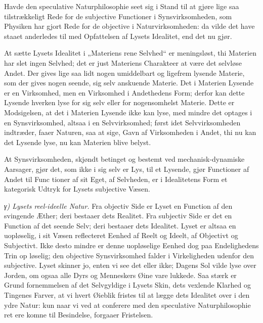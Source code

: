 \documentclass[12pt,a4paper]{book}
\newcommand{\subrunin}[1]{\emph{#1}\hspace{0.4em}}
\begin{document}
Havde den speculative Naturphilosophie seet sig i Stand til at gjøre
lige saa tilstrækkeligt Rede for de subjective Functioner i
Synsvirksomheden, som Physiken har gjort Rede for de objective i
Naturvirksomheden: da vilde det have staaet anderledes til med
Opfattelsen af Lysets Idealitet, end det nu gjør.

At sætte Lysets Idealitet i „Materiens rene Selvhed“ er meningsløst,
thi Materien har slet ingen Selvhed; det er just Materiens Charakteer
at være det selvløse Andet. Der gives lige saa lidt nogen umiddelbart
og ligefrem lysende Materie, som der gives nogen seende, sig selv
anskuende Materie. Det i Materien Lysende er en Virksomhed, men en
Virksomhed i Andethedens Form; derfor kan dette Lysende hverken lyse
for sig selv eller for nogensomhelst Materie. Dette er Modsigelsen, at
det i Materien Lysende ikke kan lyse, med mindre det optages i en
Synsvirksomhed, altsaa i en Selvvirksomhed; først idet
Selvvirksomheden indtræder, faaer Naturen, saa at sige, Gavn af
Virksomheden i Andet, thi nu kan det Lysende lyse, nu kan Materien
blive belyst.

At Synsvirksomheden, skjøndt betinget og bestemt ved
mechanisk-dynamiske Aarsager, gjør det, som ikke i sig selv er Lys, til
et Lysende, gjør Functioner af Andet til Func\-%
tioner af sit Eget, af Selvheden, er i Idealitetens Form et kategorisk
Udtryk for Lysets subjective Væsen.

\subrunin{γ) Lysets reel-ideelle Natur.} Fra objectiv Side er Lyset en
Function af den svingende Æther; deri bestaaer dets Realitet. Fra
subjectiv Side er det en Function af det seende Selv; deri bestaaer
dets Idealitet. Lyset er altsaa en uopløselig, i sit Væsen reflecteret
Eenhed af Reelt og Ideelt, af Objectivt og Subjectivt. Ikke desto
mindre er
denne uopløselige Eenhed dog paa Endelighedens Trin op\-%
løselig; den objective Synsvirksomhed falder i Virkeligheden udenfor
den subjective. Lyset skinner jo, enten vi see det eller ikke; Dagens
Sol vilde lyse over Jorden, om ogsaa alle Dyrs og Menneskers Øine vare
lukkede. Saa stærk er Grund\-%
fornemmelsen af det Selvgyldige i Lysets Skin, dets vexlende Klarhed og
Tingenes Farver, at vi hvert Øieblik fristes til at lægge dets
Idealitet over i den ydre Natur: kun naar vi ved at conferere med den
speculative Naturphilosophie ret ere komne til Besindelse, forgaaer
Fristelsen.
\end{document}
